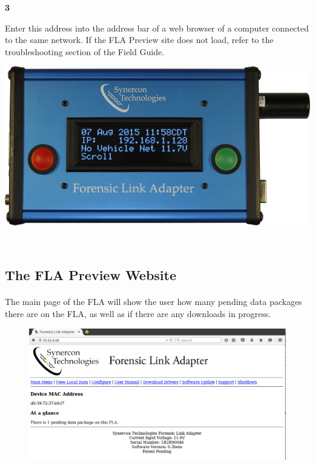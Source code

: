 \documentclass[11pt]{article}
\begin{document}
\noindent\begin{minipage}{0.3\textwidth}%
\begin{center}
\textbf{3}\\[\baselineskip]
\end{center}
Enter this address into the address bar of a web browser of a computer connected to the same network. If the FLA Preview site does not load, refer to the troubleshooting section of the Field Guide.
\end{minipage}%
\hfill%
\begin{minipage}{0.6\textwidth}
\includegraphics[width=\linewidth]{../media/fla_screens/ethernet_and_others/main/title_no_net}
\end{minipage}\\[\baselineskip]
\subsection{The FLA Preview Website}
\paragraph{}
The main page of the FLA will show the user how many pending data packages there are on the FLA, as well as if there are any downloads in progress.
\begin{figure}[tbph]
\centering
\includegraphics[width=.95\linewidth]{../media/fla_preview_screenshots/main_page}
\label{fig:fla_preview_main_page}
\end{figure}
\end{document}
